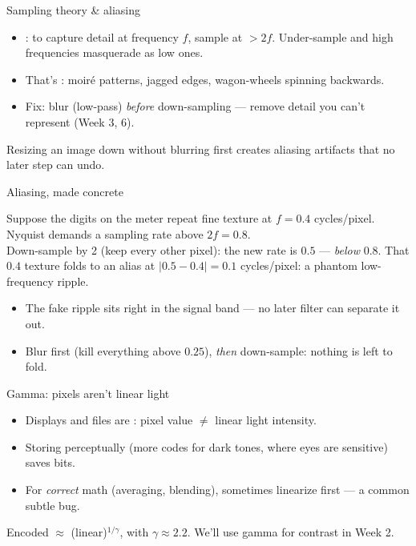 \documentclass[10pt,aspectratio=169]{beamer}
\begin{document}
\begin{frame}{Sampling theory \& aliasing}
  \begin{itemize}
    \item {}: to capture detail at frequency $f$, sample at $>2f$. Under-sample and high frequencies masquerade as low ones.
    \item That's : moir\'e patterns, jagged edges, wagon-wheels spinning backwards.
    \item Fix: blur (low-pass) \emph{before} down-sampling — remove detail you can't represent (Week 3, 6).
  \end{itemize}
  \begin{badbox}
    Resizing an image down without blurring first creates aliasing artifacts that no later step can undo.
  \end{badbox}
\end{frame}

\begin{frame}{Aliasing, made concrete}
  \begin{mathbox}
    Suppose the digits on the meter repeat fine texture at \(f = 0.4\) cycles/pixel.
    Nyquist demands a sampling rate above \(2f = 0.8\). \\[3pt]
    Down-sample by 2 (keep every other pixel): the new rate is \(0.5\) — \emph{below} \(0.8\).
    That \(0.4\) texture folds to an alias at \(|0.5 - 0.4| = 0.1\) cycles/pixel: a phantom low-frequency ripple.
  \end{mathbox}
  \begin{itemize}
    \item The fake ripple sits right in the signal band — no later filter can separate it out.
    \item Blur first (kill everything above \(0.25\)), \emph{then} down-sample: nothing is left to fold.
  \end{itemize}
\end{frame}

\begin{frame}{Gamma: pixels aren't linear light}
  \begin{itemize}
    \item Displays and files are : pixel value $\ne$ linear light intensity.
    \item Storing perceptually (more codes for dark tones, where eyes are sensitive) saves bits.
    \item For \emph{correct} math (averaging, blending), sometimes linearize first — a common subtle bug.
  \end{itemize}
  \begin{mathbox}
    Encoded $\approx$ (linear)$^{1/\gamma}$, with $\gamma\approx 2.2$. We'll use gamma for contrast in Week 2.
  \end{mathbox}
\end{frame}
\end{document}
